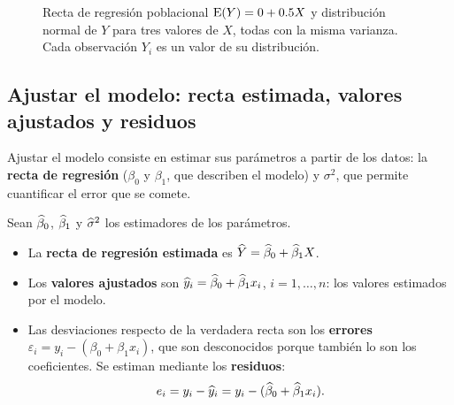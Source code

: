 \begin{figure}[H]
  \centering
  \caption{Recta de regresión poblacional $\operatorname{E}(Y)=0+0.5X$ y distribución normal de $Y$ para tres
    valores de $X$, todas con la misma varianza. Cada observación $Y_i$ es un valor de su
    distribución.}
\end{figure}

\subsection{Ajustar el modelo: recta estimada, valores ajustados y residuos}

Ajustar el modelo consiste en estimar sus parámetros a partir de los datos: la \textbf{recta de
regresión} ($\beta_0$ y $\beta_1$, que describen el modelo) y $\sigma^2$, que permite cuantificar
el error que se comete.

\begin{definicion}
  Sean $\widehat{\beta}_0$, $\widehat{\beta}_1$ y $\widehat{\sigma}^2$ los estimadores de los parámetros.
  \begin{itemize}
    \item La \textbf{recta de regresión estimada} es $\widehat{Y}=\widehat{\beta}_0+\widehat{\beta}_1X$.
    \item Los \textbf{valores ajustados} son $\widehat{y}_i=\widehat{\beta}_0+\widehat{\beta}_1x_i$,
      $i=1,\ldots,n$: los valores estimados por el modelo.
    \item Las desviaciones respecto de la verdadera recta son los \textbf{errores}
      $\varepsilon_i=y_i-(\beta_0+\beta_1x_i)$, que son desconocidos porque también lo son los
      coeficientes. Se estiman mediante los \textbf{residuos}:
      \[
        e_i = y_i-\widehat{y}_i = y_i-(\widehat{\beta}_0+\widehat{\beta}_1x_i).
      \]
  \end{itemize}
\end{definicion}

